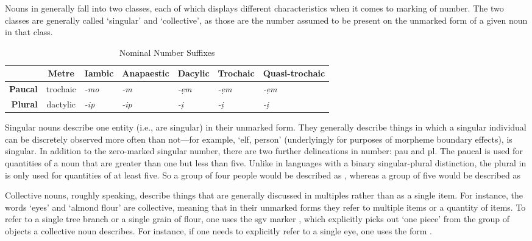 \documentclass[a4paper,11pt,oneside,openany]{memoir}
\begin{document}
Nouns in \parentlang{} generally fall into two classes, each of which displays different characteristics when it comes to marking of number. The two classes are generally called `singular' and `collective', as those are the number assumed to be present on the unmarked form of a given noun in that class. 

\begin{table}[htb]
    \centering
    \begin{tabular}{@{}rclllll@{}}
    \toprule
     & \textbf{Metre} & \multicolumn{1}{c}{\textbf{Iambic}} & \multicolumn{1}{c}{\textbf{Anapaestic}} & \multicolumn{1}{c}{\textbf{Dacylic}} & \multicolumn{1}{c}{\textbf{Trochaic}} & \multicolumn{1}{c}{\textbf{Quasi-trochaic}} \\\midrule
    \textbf{Paucal} & trochaic & \textit{-\supglot{}mo} & \textit{-\supglot{}m} & \textit{-\supglot{}ẹm} & \textit{-\supglot{}ẹm} & \textit{-\supglot{}ẹm} \\
    \textbf{Plural} & dactylic & \textit{-\supglot{}\ppa{}ip} & \textit{-\supglot{}\ppa{}ip} & \textit{-\supglot{}ị\ppa{}} & \textit{-\supglot{}ị\ppa{}} & \textit{-\supglot{}ị\ppa{}} \\\bottomrule
    \end{tabular}
    \caption{Nominal Number Suffixes}
    \label{tab:noun-num}
\end{table}

Singular nouns describe one entity (i.e., are singular) in their unmarked form. They generally describe things in which a singular individual can be discretely observed more often than not---for example,  `elf, person' (underlyingly  for purposes of morpheme boundary effects), is singular. In addition to the zero-marked singular number, there are two further delineations in number: \gls{pau} and \gls{pl}. The paucal is used for quantities of a noun that are greater than one but less than five. Unlike in languages with a binary singular-plural distinction, the plural in \parentlang{} is only used for quantities of at least five. So a group of four people would be described as , whereas a group of five would be described as 

Collective nouns, roughly speaking, describe things that are generally discussed in multiples rather than as a single item. For instance, the words  `eyes' and  `almond flour' are collective, meaning that in their unmarked forms they refer to multiple items or a quantity of items. To refer to a single tree branch or a single grain of flour, one uses the \gls{sgv} marker , which explicitly picks out `one piece' from the group of objects a collective noun describes. For instance, if one needs to explicitly refer to a single eye, one uses the form . 
\end{document}
